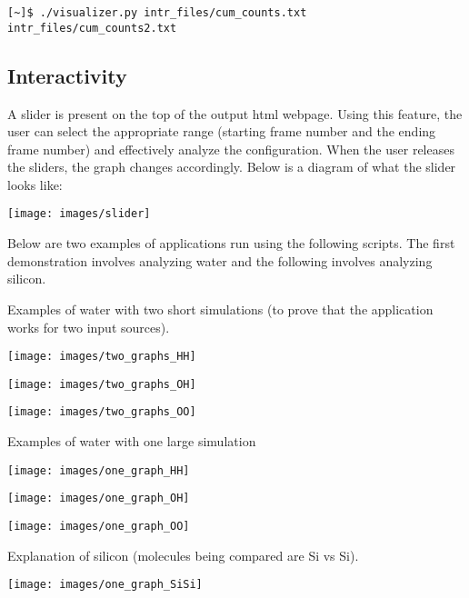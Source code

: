 \begin{verbatim}
[~]$ ./visualizer.py intr_files/cum_counts.txt intr_files/cum_counts2.txt 
\end{verbatim}


\subsection*{Interactivity}

A slider is present on the top of the output html webpage. Using this feature, the user can select the appropriate range (starting frame number and the ending frame number) and effectively analyze the configuration. When the user releases the sliders, the graph changes accordingly. Below is a diagram of what the slider looks like:


\texttt{[image: images/slider]}


Below are two examples of applications run using the following scripts. The first demonstration involves analyzing water and the following involves analyzing silicon. 

Examples of water with two short simulations (to prove that the application works for two input sources).

\texttt{[image: images/two\_graphs\_HH]}

\texttt{[image: images/two\_graphs\_OH]}

\texttt{[image: images/two\_graphs\_OO]}

Examples of water with one large simulation

\texttt{[image: images/one\_graph\_HH]}

\texttt{[image: images/one\_graph\_OH]}

\texttt{[image: images/one\_graph\_OO]}

Explanation of silicon (molecules being compared are Si vs Si).

\texttt{[image: images/one\_graph\_SiSi]}
